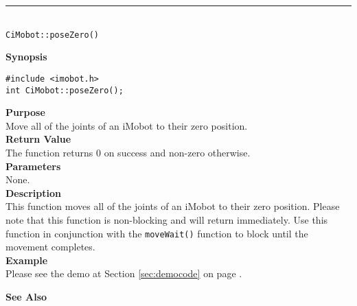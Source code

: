 \noindent
\vspace{5pt}
\rule{4.5in}{0.015in}\\
\noindent
{\LARGE \texttt{CiMobot::poseZero()}}\\
{}

\noindent
{\bf Synopsis}\\
\begin{verbatim}
#include <imobot.h>
int CiMobot::poseZero();
\end{verbatim}

\noindent
{\bf Purpose}\\
Move all of the joints of an iMobot to their zero position.\\

\noindent
{\bf Return Value}\\
The function returns 0 on success and non-zero otherwise.\\

\noindent
{\bf Parameters}\\
None.\\

\noindent
{\bf Description}\\
This function moves all of the joints of an iMobot to their zero position.
Please note that this function is non-blocking and will return immediately. Use
this function in conjunction with the \texttt{moveWait()} function to block
until the movement completes.\\

\noindent
{\bf Example}\\
Please see the demo at Section \ref{sec:democode} on page \pageref{sec:democode}.\\
\noindent

\noindent
{\bf See Also}\\

